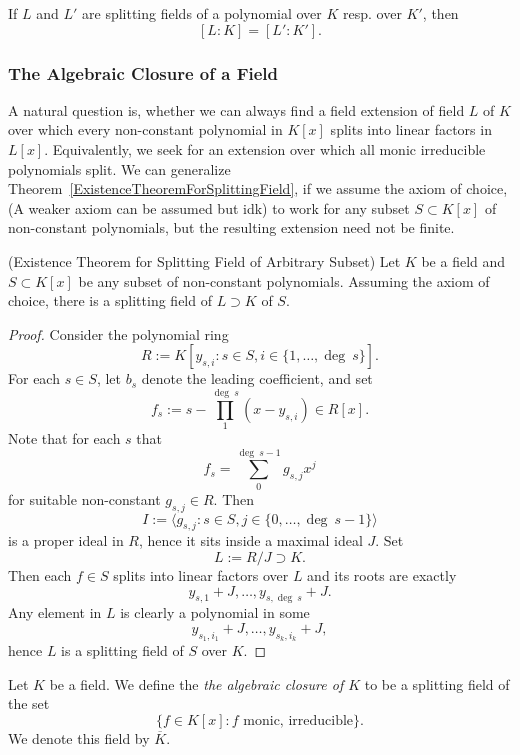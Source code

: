     \begin{corollary}
        If $L$ and $L'$ are splitting fields of a polynomial over $K$ resp. over $K'$, then 
        $$
            [L : K] = [L' : K'].
        $$
    \end{corollary}
\subsubsection{The Algebraic Closure of a Field}
    A natural question is, whether we can always find a field extension of field $L$ of  $K$ over which every non-constant polynomial in $K[x]$ splits into linear factors in $L[x]$. Equivalently, we seek for an extension over which all monic irreducible polynomials split. We can generalize Theorem~\ref{ExistenceTheoremForSplittingField}, if we assume the axiom of choice, {\Large (A weaker axiom can be assumed but idk)} to work for any subset $S\subset K[x]$ of non-constant polynomials, but the resulting extension need not be finite.
    \begin{theorem}
            (Existence Theorem for Splitting Field of Arbitrary Subset) Let $K$ be a field and $S\subset K[x]$ be any subset of non-constant polynomials. Assuming the axiom of choice, there is a splitting field of $L\supset K$ of $S$.
    \end{theorem}  
    \begin{proof}
        Consider the polynomial ring 
        $$
            R := K[y_{s,i} : s\in S, i\in \{1,\dots, \deg \ s\}].
        $$
        For each $s\in S$, let $b_s$ denote the leading coefficient, and set 
        $$
            f_s := s - \prod_1^{\deg \ s} (x-y_{s,i})\in R[x].
        $$
        Note that for each $s$ that
        $$
            f_s = \sum_0^{\deg \ s -1} g_{s,j}x^j
        $$
        for suitable non-constant $g_{s,j}\in R$. Then 
        $$
            I := \langle g_{s,j} : s\in S, j\in\{0,\dots, \deg\ s -1\}\rangle 
        $$
        is a proper ideal in $R$, hence it sits inside a maximal ideal $J$. Set 
        $$
            L := R/J \supset K.
        $$
        Then each $f\in S$ splits into linear factors over $L$ and its roots are exactly 
        $$
            y_{s,1} + J,\dots, y_{s,\deg\ s }+J.       
        $$
        Any element in $L$ is clearly a polynomial in some 
        $$
            y_{s_{1},i_{1}}+J,\dots, y_{s_{k},i_k} + J,
        $$
        hence $L$ is a splitting field of $S$ over $K$. 
    \end{proof}
    \begin{definition}
        Let $K$ be a field. We define the \emph{the algebraic closure of $K$} to be a splitting field of the set 
        $$
            \{f \in K[x] : f \text{ monic, irreducible}\}.
        $$
        We denote this field by $\overline{K}$. 
    \end{definition}
